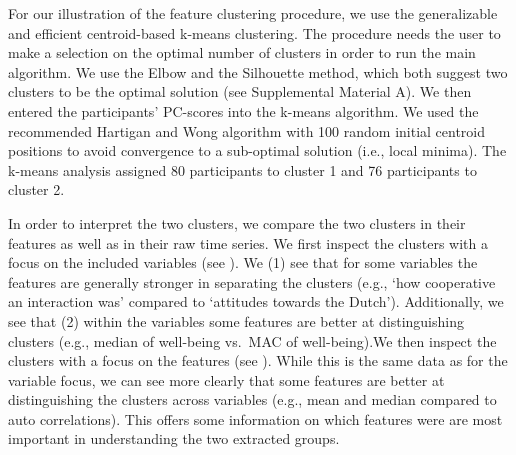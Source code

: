 For our illustration of the feature clustering procedure, we use the
generalizable and efficient centroid-based k-means clustering. The
procedure needs the user to make a selection on the optimal number of
clusters in order to run the main algorithm. We use the Elbow and the
Silhouette method, which both suggest two clusters to be the optimal
solution (see Supplemental Material A). We then entered the
participants' PC-scores into the k-means algorithm. We used the
recommended Hartigan and Wong algorithm \citep{hartigan1979} with 100
random initial centroid positions to avoid convergence to a sub-optimal
solution (i.e., local minima). The k-means analysis assigned 80
participants to cluster 1 and 76 participants to cluster 2.

In order to interpret the two clusters, we compare the two clusters in
their features as well as in their raw time series. We first inspect the
clusters with a focus on the included variables (see
). We (1) see that for some variables the
features are generally stronger in separating the clusters (e.g., `how
cooperative an interaction was' compared to `attitudes towards the
Dutch'). Additionally, we see that (2) within the variables some
features are better at distinguishing clusters (e.g., median of
well-being vs.~MAC of well-being).We then inspect the clusters with a
focus on the features (see ). While this
is the same data as for the variable focus, we can see more clearly that
some features are better at distinguishing the clusters across variables
(e.g., mean and median compared to auto correlations). This offers some
information on which features were are most important in understanding
the two extracted groups.

